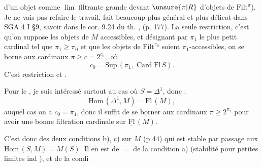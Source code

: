 d'un objet comme $\underline{\lim}$ filtrante grande devant $\unsure{\pi|R}$ d'objets de $\mathrm{Filt}^\pi$). Je ne vais pas refaire le travail, fait   beaucoup plus général et plus délicat dans SGA 4 I §9, savoir dans le cor. 9.24 du th. , (p. 177). La seule restriction, c'est qu'on  suppose les objets de $M$ accessibles, et désignant par $\pi_1$  le plus petit cardinal tel que $\pi_1\geq\pi_0$ et que les objets de $\mathrm{Filt}^{\pi_0}$ soient $\pi_1$-accessibles, on se borne  aux cardinaux $\boxed{\pi\geq c=2^{c_0},}$ où
\[
 c_0=\mathrm{Sup}\,(\pi_1,\operatorname{Card}\mathrm{Fl}\, S).
\]
C'est  restriction  et .

Pour le , je suis intéressé surtout au cas où $S=\Delta^1$, donc :
\[
 \underline{\mathrm{Hom}}\,(\Delta^1,M)=\underline{\mathrm{Fl}}\,(M),
\]
auquel cas on a $c_0=\pi_1$, donc il suffit de se borner aux cardinaux $\pi\geq 2^{\pi_1}$ pour avoir une bonne filtration cardinale sur $\underline{\mathrm{Fl}}\,(M)$.

C'est donc  des deux conditions b), c) sur $M$ (p 44) qui est stable par passage aux $\underline{\mathrm{Hom}}\,(S,M)=M(S)$. Il en est de $=$ de la condition a) (stabilité pour petites limites ind ), et  de la condi%

